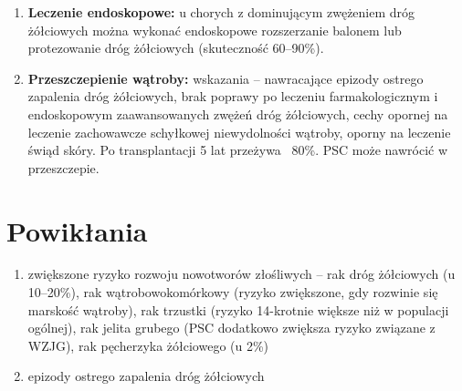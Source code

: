 \begin{enumerate}
    \item \textbf{Leczenie endoskopowe:} u chorych z dominującym zwężeniem dróg żółciowych można wykonać endoskopowe rozszerzanie balonem lub protezowanie dróg żółciowych (skuteczność 60–90\%).

    \item \textbf{Przeszczepienie wątroby:} wskazania – nawracające epizody ostrego zapalenia dróg żółciowych, brak poprawy po leczeniu farmakologicznym i endoskopowym zaawansowanych zwężeń dróg żółciowych, cechy opornej na leczenie zachowawcze schyłkowej niewydolności wątroby, oporny na leczenie świąd skóry. 
    Po transplantacji 5 lat przeżywa ~80\%. 
    PSC może nawrócić w przeszczepie.
\end{enumerate}

\section{Powikłania}

\begin{enumerate}
    \item zwiększone ryzyko rozwoju nowotworów złośliwych – rak dróg żółciowych (u 10–20\%), rak wątrobowokomórkowy (ryzyko zwiększone, gdy rozwinie się marskość wątroby), rak trzustki (ryzyko 14-krotnie większe niż w populacji ogólnej), rak jelita grubego (PSC dodatkowo zwiększa ryzyko związane z WZJG), rak pęcherzyka żółciowego (u 2\%)

    \item epizody ostrego zapalenia dróg żółciowych
\end{enumerate}

